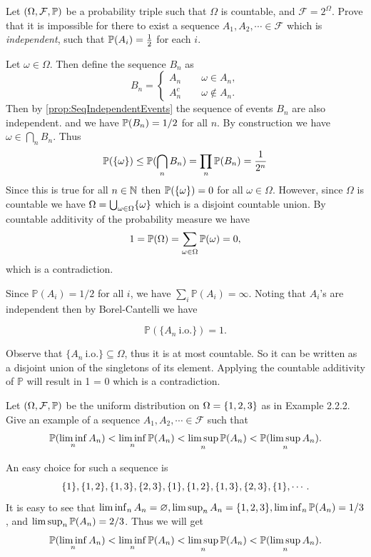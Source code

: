 \begin{problem}
	Let $ (\Omega, \mathcal{F},\mathbb{P}) $ be a probability triple such that $ \Omega $ is countable, and $ \mathcal{F} = 2^\Omega $. Prove that it is impossible for there to exist a sequence $ A_1,A_2,\cdots \in \mathcal{F} $ which is \emph{independent}, such that $ \mathbb{P}(A_i)=\frac{1}{2} $ for each $ i $.
\end{problem}
\begin{solution}
	Let $ \omega \in \Omega $. Then define the sequence $ B_n $ as 
	\[ B_n = \begin{cases}
		A_n \qquad \omega \in A_n, \\
		A_n^c \qquad \omega \notin A_n.
	\end{cases} \]
	Then by \autoref{prop:SeqIndependentEvents} the sequence of events $ B_n $ are also independent. and we have $ \mathbb{P}(B_n)=1/2 $ for all $ n $. By construction we have $ \omega \in \bigcap_n B_n $. Thus 
	\[ \mathbb{P}(\{\omega\}) \leq \mathbb{P}(\bigcap_n B_n) = \prod_n \mathbb{P}(B_n) = \frac{1}{2^n} \]
	Since this is true for all $ n \in \mathbb{N} $ then $ \mathbb{P}(\{\omega\}) = 0 $ for all $ \omega \in \Omega $. However, since $ \Omega $ is countable we have $ \Omega = \bigcup_{\omega \in \Omega}\{\omega\} $ which is a disjoint countable union. By countable additivity of the probability measure we have
	\[ 1 = \mathbb{P}(\Omega) = \sum_{\omega\in\Omega}\mathbb{P}(\omega) = 0,  \]
	which is a contradiction.
\end{solution}
\begin{solution}
	Since $\mathbb{P}(A_i) = 1/2$ for all $i$, we have $\sum_i \mathbb{P}(A_i) = \infty$. Noting that $A_i$'s are independent then by Borel-Cantelli we have
	
	$$ \mathbb{P}(\{ A_n \ \text{i.o.} \}) = 1.$$
	
	Observe that $ \{ A_n \ \text{i.o.} \} \subseteq \Omega $, thus it is at most countable. So it can be written as a disjoint union of the singletons of its element. Applying the countable additivity of $\mathbb{P}$ will result in 1 = 0 which is a contradiction.
\end{solution}

\begin{problem}
	Let $ (\Omega,\mathcal{F},\mathbb{P}) $ be the uniform distribution on $ \Omega = \{1,2,3\} $ as in Example 2.2.2. Give an example of a sequence $ A_1,A_2,\cdots\in\mathcal{F} $ such that 
	\[ \mathbb{P}(\liminf_n A_n) < \liminf_n \mathbb{P}(A_n) < \limsup_n \mathbb{P}(A_n) < \mathbb{P}(\limsup_n A_n). \]
\end{problem}
\begin{solution}
	An easy choice for such a sequence is 
	\[ \{1\},\{1,2\},\{1,3\},\{2,3\},\{1\},\{1,2\},\{1,3\},\{2,3\},\{1\},\cdots. \]
	It is easy to see that $ \liminf_n A_n = \varnothing, \limsup_n A_n = \{1,2,3\}, \liminf_n \mathbb{P}(A_n) = 1/3$, and $ \limsup_n \mathbb{P}(A_n) = 2/3 $. Thus we will get
	\[ \mathbb{P}(\liminf_n A_n) < \liminf_n \mathbb{P}(A_n) < \limsup_n \mathbb{P}(A_n) < \mathbb{P}(\limsup_n A_n). \]
\end{solution}

